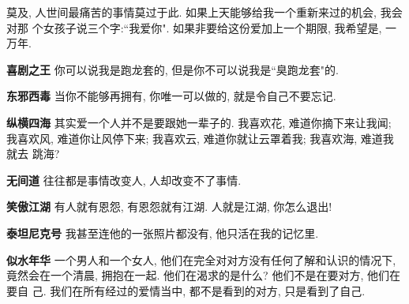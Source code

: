 \documentclass[preprint,authoryear,PhD]{cumtthesis}
\begin{document}
\begin{notation}[2.5cm]
    莫及, 人世间最痛苦的事情莫过于此. 如果上天能够给我一个重新来过的机会, 我会对那
    个女孩子说三个字:``我爱你". 如果非要给这份爱加上一个期限, 我希望是, 一万年.
\item[\bf 喜剧之王] 你可以说我是跑龙套的, 但是你不可以说我是``臭跑龙套"的.
\item[\bf 东邪西毒] 当你不能够再拥有, 你唯一可以做的, 就是令自己不要忘记.
\item[\bf 纵横四海] 其实爱一个人并不是要跟她一辈子的. 我喜欢花, 难道你摘下来让我闻;
    我喜欢风, 难道你让风停下来; 我喜欢云, 难道你就让云罩着我; 我喜欢海, 难道我就去
    跳海?
\item[\bf 无间道] 往往都是事情改变人, 人却改变不了事情.
\item[\bf 笑傲江湖] 有人就有恩怨, 有恩怨就有江湖. 人就是江湖, 你怎么退出!
\item[\bf 泰坦尼克号] 我甚至连他的一张照片都没有, 他只活在我的记忆里.
\item[\bf 似水年华] 一个男人和一个女人, 他们在完全对对方没有任何了解和认识的情况下,
    竟然会在一个清晨, 拥抱在一起. 他们在渴求的是什么? 他们不是在要对方, 他们在要自
    己. 我们在所有经过的爱情当中, 都不是看到的对方, 只是看到了自己.
\end{notation}

\mainmatter










\backmatter








\makebackcover
\printindex
\clearpage
\end{document}

